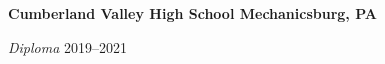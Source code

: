 \textbf{Cumberland Valley High School \hfill Mechanicsburg, PA} \par
\textit{Diploma} \hfill 2019--2021\par